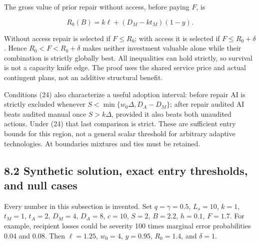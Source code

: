 \documentclass[
  11pt,
  a4paper,
]{article}
\begin{document}
The gross value of prior repair without access, before paying \(F\), is

\[R_0(B)=k\ell+(D_M-kt_M)(1-y). \tag{29}\]

Without access repair is selected if \(F\leq R_0\); with access it is
selected if \(F\leq R_0+\delta\). Hence \(R_0<F<R_0+\delta\) makes
neither investment valuable alone while their combination is strictly
globally best. All inequalities can hold strictly, so survival is not a
capacity knife edge. The proof uses the shared service price and actual
contingent plans, not an additive structural benefit.

Conditions (24) also characterize a useful adoption interval: before
repair AI is strictly excluded whenever \(S<\min\{w_0\Delta,D_A-D_M\}\);
after repair audited AI beats audited manual once \(S>k\Delta\),
provided it also beats both unaudited actions. Under (24) that last
comparison is strict. These are sufficient entry bounds for this region,
not a general scalar threshold for arbitrary adaptive technologies. At
boundaries mixtures and ties must be retained.

\hypertarget{synthetic-solution-exact-entry-thresholds-and-null-cases}{%
\subsection{8.2 Synthetic solution, exact entry thresholds, and null
cases}\label{synthetic-solution-exact-entry-thresholds-and-null-cases}}

Every number in this subsection is invented. Set \(q=\gamma=0.5\),
\(L_s=10\), \(k=1\), \(t_M=1\), \(t_A=2\), \(D_M=4\), \(D_A=8\),
\(c=10\), \(S=2\), \(B=2.2\), \(h=0.1\), \(F=1.7\). For example,
recipient losses could be severity 100 times marginal error
probabilities 0.04 and 0.08. Then \(\ell=1.25\), \(w_0=4\), \(y=0.95\),
\(R_0=1.4\), and \(\delta=1\).
\end{document}
